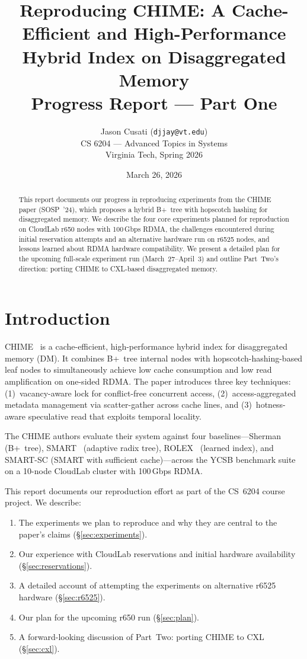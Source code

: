 \documentclass[11pt,a4paper]{article}
\title{Reproducing CHIME: A Cache-Efficient and High-Performance\\Hybrid Index on Disaggregated Memory\\[0.5em]\large Progress Report --- Part One}
\author{Jason Cusati (\texttt{djjay@vt.edu})\\
CS 6204 --- Advanced Topics in Systems\\
Virginia Tech, Spring 2026}
\date{March 26, 2026}
\begin{document}
\maketitle

\begin{abstract}
This report documents our progress in reproducing experiments from the CHIME paper (SOSP~'24), which proposes a hybrid B+~tree with hopscotch hashing for disaggregated memory. We describe the four core experiments planned for reproduction on CloudLab r650 nodes with 100\,Gbps RDMA, the challenges encountered during initial reservation attempts and an alternative hardware run on r6525 nodes, and lessons learned about RDMA hardware compatibility. We present a detailed plan for the upcoming full-scale experiment run (March~27--April~3) and outline Part~Two's direction: porting CHIME to CXL-based disaggregated memory.
\end{abstract}

\section{Introduction}

CHIME~\cite{chime2024} is a cache-efficient, high-performance hybrid index for disaggregated memory (DM). It combines B+~tree internal nodes with hopscotch-hashing-based leaf nodes to simultaneously achieve low cache consumption and low read amplification on one-sided RDMA. The paper introduces three key techniques: (1)~vacancy-aware lock for conflict-free concurrent access, (2)~access-aggregated metadata management via scatter-gather across cache lines, and (3)~hotness-aware speculative read that exploits temporal locality.

The CHIME authors evaluate their system against four baselines---Sherman~\cite{sherman2022} (B+~tree), SMART~\cite{smart2023} (adaptive radix tree), ROLEX~\cite{rolex2023} (learned index), and SMART-SC (SMART with sufficient cache)---across the YCSB benchmark suite on a 10-node CloudLab cluster with 100\,Gbps RDMA.

This report documents our reproduction effort as part of the CS~6204 course project. We describe:
\begin{enumerate}[nosep]
    \item The experiments we plan to reproduce and why they are central to the paper's claims (\S\ref{sec:experiments}).
    \item Our experience with CloudLab reservations and initial hardware availability (\S\ref{sec:reservations}).
    \item A detailed account of attempting the experiments on alternative r6525 hardware (\S\ref{sec:r6525}).
    \item Our plan for the upcoming r650 run (\S\ref{sec:plan}).
    \item A forward-looking discussion of Part~Two: porting CHIME to CXL (\S\ref{sec:cxl}).
\end{enumerate}
\end{document}
